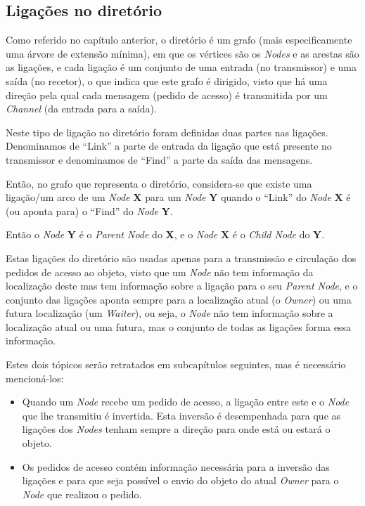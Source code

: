 \subsection*{Ligações no diretório}

Como referido no capítulo anterior, o diretório é um grafo (mais especificamente uma árvore de extensão mínima), em que os vértices são os \emph{Nodes} e as arestas são as ligações, e cada ligação é um conjunto de uma entrada (no transmissor) e uma saída (no recetor), o que indica que este grafo é dirigido, visto que há uma direção pela qual cada mensagem (pedido de acesso) é transmitida por um \emph{Channel} (da entrada para a saída).

Neste tipo de ligação no diretório foram definidas duas partes nas ligações. Denominamos de  ``Link'' a parte de entrada da ligação que está presente no transmissor e denominamos de ``Find'' a parte da saída das mensagens.

Então, no grafo que representa o diretório, considera-se que existe uma ligação/um arco de um \emph{Node} \textbf{X} para um \emph{Node} \textbf{Y} quando o ``Link'' do 
\emph{Node} \textbf{X}  é (ou aponta para) o ``Find'' do \emph{Node} \textbf{Y}.

Então o \emph{Node} \textbf{Y} é o \emph{Parent Node} do \textbf{X}, e o \emph{Node} \textbf{X} é o \emph{Child Node} do \textbf{Y}.

Estas ligações do diretório são usadas apenas para a transmissão e circulação dos pedidos de acesso ao objeto, visto que um \emph{Node} não tem informação da localização deste mas tem informação sobre a ligação para o seu \emph{Parent Node},
e o conjunto das ligações aponta sempre para a localização atual (o \emph{Owner}) ou uma futura localização (um \emph{Waiter}), ou seja, o \emph{Node} não tem informação sobre a localização atual ou uma futura, mas o conjunto de todas as ligações forma essa informação.

Estes dois tópicos serão retratados em subcapítulos seguintes, mas é necessário mencioná-los:
\begin{itemize}
    \item Quando um \emph{Node} recebe um pedido de acesso, a ligação entre este e o \emph{Node} que lhe transmitiu é invertida. Esta inversão é desempenhada para que as ligações dos \emph{Nodes} tenham sempre a direção para onde está ou estará o objeto.

    \item Os pedidos de acesso contém informação necessária para a inversão das ligações e para que seja possível o envio do objeto do atual \emph{Owner} para o \emph{Node} que realizou o pedido.
\end{itemize}

